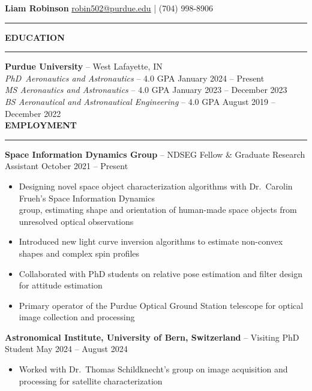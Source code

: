 \documentclass[10pt, a4paper]{article}
\newcommand{\sectiontitle}[1]{{\Large \textbf{#1}}\vspace{0.5em}\hrule\vspace{0.5em}}
\begin{document}
\thispagestyle{empty}

\sffamily
\renewcommand*{\bibfont}{\normalfont\normalsize\sffamily}

\noindent
\textbf{\huge Liam Robinson} \hfill \href{mailto:robin502@purdue.edu}{robin502@purdue.edu} | (704) 998-8906
\rule{\linewidth}{4pt}
\vspace{-0.5em}

\sectiontitle{EDUCATION}
\textbf{Purdue University} -- West Lafayette, IN \\
\textit{PhD\ Aeronautics and Astronautics} -- 4.0 GPA \hfill January 2024 -- Present \\
\textit{MS \hspace{1px} Aeronautics and Astronautics} -- 4.0 GPA \hfill January 2023 -- December 2023 \\
\textit{BS \hspace{3px} Aeronautical and Astronautical Engineering} -- 4.0 GPA \hfill August 2019 -- December 2022 \\

\sectiontitle{EMPLOYMENT}
\textbf{Space Information Dynamics Group} -- NDSEG Fellow \& Graduate Research Assistant \hfill October 2021 -- Present
\begin{itemize}[noitemsep]
    \item Designing novel space object characterization algorithms with Dr.\ Carolin Frueh's Space Information Dynamics \\group, estimating shape and orientation of human-made space objects from unresolved optical observations
    \item Introduced new light curve inversion algorithms to estimate non-convex shapes and complex spin profiles
    \item Collaborated with PhD students on relative pose estimation and filter design for attitude estimation
    \item Primary operator of the Purdue Optical Ground Station telescope for optical image collection and processing
\end{itemize}

\textbf{Astronomical Institute, University of Bern, Switzerland} -- Visiting PhD Student \hfill May 2024 -- August 2024
\begin{itemize}[noitemsep]
    \item Worked with Dr.\ Thomas Schildknecht's group on image acquisition and processing for satellite characterization
\end{itemize}
\end{document}
